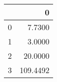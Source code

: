 \begin{tabular}{lr}
\toprule
{} &         0 \\
\midrule
0 &    7.7300 \\
1 &    3.0000 \\
2 &   20.0000 \\
3 &  109.4492 \\
\bottomrule
\end{tabular}

